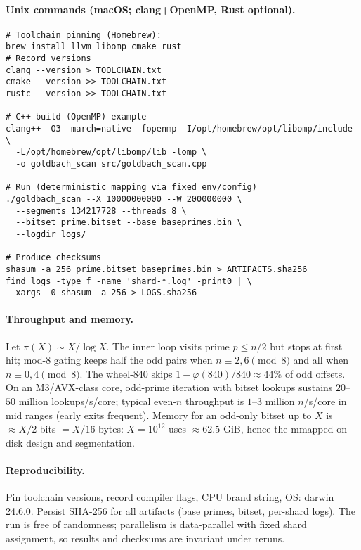 \documentclass[11pt]{article}
\theoremstyle{definition}
\theoremstyle{remark}
\begin{document}
\paragraph{Unix commands (macOS; clang+OpenMP, Rust optional).}
\begin{verbatim}
# Toolchain pinning (Homebrew):
brew install llvm libomp cmake rust
# Record versions
clang --version > TOOLCHAIN.txt
cmake --version >> TOOLCHAIN.txt
rustc --version >> TOOLCHAIN.txt

# C++ build (OpenMP) example
clang++ -O3 -march=native -fopenmp -I/opt/homebrew/opt/libomp/include \
  -L/opt/homebrew/opt/libomp/lib -lomp \
  -o goldbach_scan src/goldbach_scan.cpp

# Run (deterministic mapping via fixed env/config)
./goldbach_scan --X 10000000000 --W 200000000 \
  --segments 134217728 --threads 8 \
  --bitset prime.bitset --base baseprimes.bin \
  --logdir logs/

# Produce checksums
shasum -a 256 prime.bitset baseprimes.bin > ARTIFACTS.sha256
find logs -type f -name 'shard-*.log' -print0 | \
  xargs -0 shasum -a 256 > LOGS.sha256
\end{verbatim}

\paragraph{Throughput and memory.} Let $\pi(X)\sim X/\log X$. The inner loop visits prime $p\le n/2$ but stops at first hit; mod-8 gating keeps half the odd pairs when $n\equiv 2,6\pmod 8$ and all when $n\equiv 0,4\pmod 8$. The wheel-$840$ skips $1{-}\varphi(840)/840\approx 44\%$ of odd offsets. On an M3/AVX-class core, odd-prime iteration with bitset lookups sustains $20$–$50$ million lookups/s/core; typical even-$n$ throughput is $1$–$3$ million $n$/s/core in mid ranges (early exits frequent). Memory for an odd-only bitset up to $X$ is $\approx X/2$ bits $= X/16$ bytes: $X=10^{12}$ uses $\approx 62.5$ GiB, hence the mmapped-on-disk design and segmentation.

\paragraph{Reproducibility.} Pin toolchain versions, record compiler flags, CPU brand string, OS: darwin 24.6.0. Persist SHA-256 for all artifacts (base primes, bitset, per-shard logs). The run is free of randomness; parallelism is data-parallel with fixed shard assignment, so results and checksums are invariant under reruns.
\end{document}
